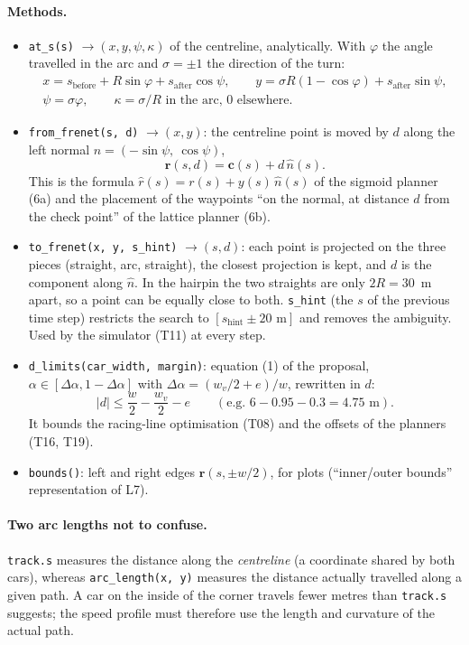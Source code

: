 \documentclass[11pt,a4paper]{article}
\newcommand{\code}[1]{\texttt{#1}}
\begin{document}
\paragraph{Methods.}
\begin{itemize}
  \item \code{at\_s(s)} $\to (x, y, \psi, \kappa)$ of the centreline, analytically. With
  $\varphi$ the angle travelled in the arc and $\sigma=\pm1$ the direction of the turn:
  \begin{gather*}
     x = s_{\text{before}} + R\sin\varphi + s_{\text{after}}\cos\psi, \qquad
     y = \sigma R(1-\cos\varphi) + s_{\text{after}}\sin\psi, \\
     \psi = \sigma\varphi, \qquad \kappa = \sigma/R \text{ in the arc, } 0 \text{ elsewhere.}
  \end{gather*}
  \item \code{from\_frenet(s, d)} $\to (x,y)$: the centreline point is moved by $d$ along the left
  normal $\hat n = (-\sin\psi,\ \cos\psi)$,
  \[ \mathbf{r}(s,d) = \mathbf{c}(s) + d\,\hat n(s). \]
  This is the formula $\hat r(s) = r(s) + y(s)\,\hat n(s)$ of the sigmoid planner (6a) and the
  placement of the waypoints ``on the normal, at distance $d$ from the check point'' of the
  lattice planner (6b).
  \item \code{to\_frenet(x, y, s\_hint)} $\to (s,d)$: each point is projected on the three
  pieces (straight, arc, straight), the closest projection is kept, and $d$ is the component
  along $\hat n$. In the hairpin the two straights are only $2R=30$~m apart, so a point can be
  equally close to both. \code{s\_hint} (the $s$ of the previous time step) restricts the search
  to $[s_{\text{hint}} \pm 20\text{ m}]$ and removes the ambiguity. Used by the simulator (T11)
  at every step.
  \item \code{d\_limits(car\_width, margin)}: equation (1) of the proposal,
  $\alpha\in[\Delta\alpha, 1-\Delta\alpha]$ with $\Delta\alpha = (w_v/2+e)/w$, rewritten in $d$:
  \[ |d| \le \frac{w}{2} - \frac{w_v}{2} - e
     \qquad (\text{e.g. } 6 - 0.95 - 0.3 = 4.75 \text{ m}). \]
  It bounds the racing-line optimisation (T08) and the offsets of the planners (T16, T19).
  \item \code{bounds()}: left and right edges $\mathbf{r}(s, \pm w/2)$, for plots
  (``inner/outer bounds'' representation of L7).
\end{itemize}

\paragraph{Two arc lengths not to confuse.} \code{track.s} measures the distance along the
\emph{centreline} (a coordinate shared by both cars), whereas \code{arc\_length(x, y)}
measures the distance actually travelled along a given path. A car on the inside of the
corner travels fewer metres than \code{track.s} suggests; the speed profile must therefore use
the length and curvature of the actual path.
\end{document}
